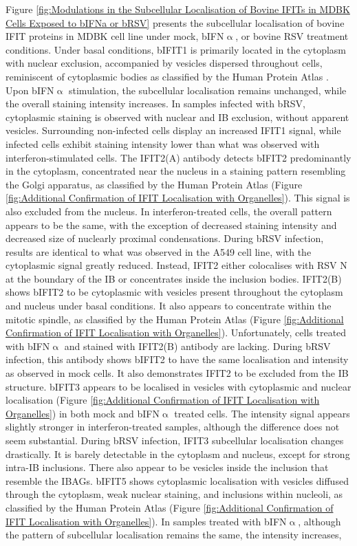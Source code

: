 Figure \ref{fig:Modulations in the Subcellular Localisation of Bovine IFITs in MDBK Cells Exposed to bIFNa or bRSV} presents the subcellular localisation of bovine IFIT proteins in MDBK cell line under mock, bIFN$\upalpha$, or bovine RSV treatment conditions. Under basal conditions, bIFIT1 is primarily located in the cytoplasm with nuclear exclusion, accompanied by vesicles dispersed throughout cells, reminiscent of cytoplasmic bodies as classified by the Human Protein Atlas \cite{Thul2017AProteome}. Upon bIFN$\upalpha$ stimulation, the subcellular localisation remains unchanged, while the overall staining intensity increases. In samples infected with bRSV, cytoplasmic staining is observed with nuclear and IB exclusion, without apparent vesicles. Surrounding non-infected cells display an increased IFIT1 signal, while infected cells exhibit staining intensity lower than what was observed with interferon-stimulated cells. The IFIT2(A) antibody detects bIFIT2 predominantly in the cytoplasm, concentrated near the nucleus in a staining pattern resembling the Golgi apparatus, as classified by the Human Protein Atlas \cite{Thul2017AProteome} (Figure \ref{fig:Additional Confirmation of IFIT Localisation with Organelles}). This signal is also excluded from the nucleus. In interferon-treated cells, the overall pattern appears to be the same, with the exception of decreased staining intensity and decreased size of nuclearly proximal condensations. During bRSV infection, results are identical to what was observed in the A549 cell line, with the cytoplasmic signal greatly reduced. Instead, IFIT2 either colocalises with RSV N at the boundary of the IB or concentrates inside the inclusion bodies. IFIT2(B) shows bIFIT2 to be cytoplasmic with vesicles present throughout the cytoplasm and nucleus under basal conditions. It also appears to concentrate within the mitotic spindle, as classified by the Human Protein Atlas \cite{Thul2017AProteome} (Figure \ref{fig:Additional Confirmation of IFIT Localisation with Organelles}). Unfortunately, cells treated with bIFN$\upalpha$ and stained with IFIT2(B) antibody are lacking. During bRSV infection, this antibody shows bIFIT2 to have the same localisation and intensity as observed in mock cells. It also demonstrates IFIT2 to be excluded from the IB structure. bIFIT3 appears to be localised in vesicles with cytoplasmic and nuclear localisation (Figure \ref{fig:Additional Confirmation of IFIT Localisation with Organelles}) in both mock and bIFN$\upalpha$ treated cells. The intensity signal appears slightly stronger in interferon-treated samples, although the difference does not seem substantial. During bRSV infection, IFIT3 subcellular localisation changes drastically. It is barely detectable in the cytoplasm and nucleus, except for strong intra-IB inclusions. There also appear to be vesicles inside the inclusion that resemble the IBAGs. bIFIT5 shows cytoplasmic localisation with vesicles diffused through the cytoplasm, weak nuclear staining, and inclusions within nucleoli, as classified by the Human Protein Atlas \cite{Thul2017AProteome} (Figure \ref{fig:Additional Confirmation of IFIT Localisation with Organelles}). In samples treated with bIFN$\upalpha$, although the pattern of subcellular localisation remains the same, the intensity increases, 